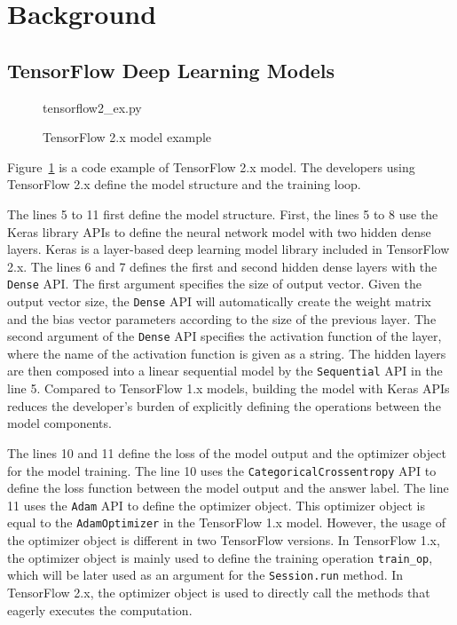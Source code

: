 \section{Background}\label{sec:background}

\subsection{TensorFlow Deep Learning Models}


\begin{figure}[ht!]

{tensorflow2_ex.py}
  \caption{TensorFlow 2.x model example}
\label{fig:back:tf2}
\end{figure}

Figure~\ref{fig:back:tf2} is a code example of TensorFlow 2.x model.
The developers using TensorFlow 2.x define the model structure and the training
loop. 

The lines 5 to 11 first define the model structure.
First, the lines 5 to 8 use the Keras library APIs to define the neural
network model with two hidden dense layers.
Keras is a layer-based deep learning model library included in TensorFlow 2.x.
The lines 6 and 7 defines the first and second hidden dense layers
with the {\tt Dense} API.
The first argument specifies the size of output vector.
Given the output vector size, the {\tt Dense} API will automatically create
the weight matrix and the bias vector parameters according to the size of 
the previous layer.
The second argument of the {\tt Dense} API 
specifies the activation function of the layer,
where the name of the activation function is given as a string. 
The hidden layers are then composed into a linear sequential model
by the {\tt Sequential} API in the line 5.
Compared to TensorFlow 1.x models, building the model with Keras APIs
reduces the developer's burden of explicitly defining the operations between 
the model components.

The lines 10 and 11 define the loss of the model output and
the optimizer object for the model training.
The line 10 uses the {\tt CategoricalCrossentropy} API to 
define the loss function between the model output and the answer label.
The line 11 uses the {\tt Adam} API to define the optimizer object.
This optimizer object is equal to the {\tt AdamOptimizer} in the TensorFlow
1.x model.
However, the usage of the optimizer object is different in two TensorFlow
versions.
In TensorFlow 1.x, the optimizer object is mainly used to define the
training operation {\tt train\_op}, which will be later used as an argument
for the {\tt Session.run} method.
In TensorFlow 2.x, the optimizer object is used to directly call the methods 
that eagerly executes the computation.

